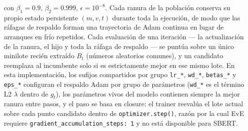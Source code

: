 con $\beta_1 = 0.9$, $\beta_2 = 0.999$, $\epsilon = 10^{-8}$. Cada ranura de la población conserva su propio estado persistente $(m, v, t)$ durante toda la ejecución, de modo que las ráfagas de respaldo forman una trayectoria de Adam continua en lugar de arranques en frío repetidos. Cada evaluación de una iteración — la actualización de la ranura, el hijo y toda la ráfaga de respaldo — se puntúa sobre un único minilote recién extraído $B_t$ (números aleatorios comunes), y un candidato reemplaza al incumbente solo si es estrictamente mejor en ese mismo lote. En esta implementación, los sufijos compartidos por grupo \texttt{lr\_*}, \texttt{wd\_*}, \texttt{betas\_*} y \texttt{eps\_*} configuran el respaldo Adam por grupo de parámetros (\texttt{wd\_*} es el término L2 $\lambda$ dentro de $g_t$), los parámetros vivos del modelo contienen siempre la mejor ranura entre pasos, y el paso se basa en closure: el trainer reevalúa el lote actual sobre cada punto candidato dentro de \texttt{optimizer.step()}, razón por la cual EvE requiere \texttt{gradient\_accumulation\_steps: 1} y no está disponible para SBERT.

